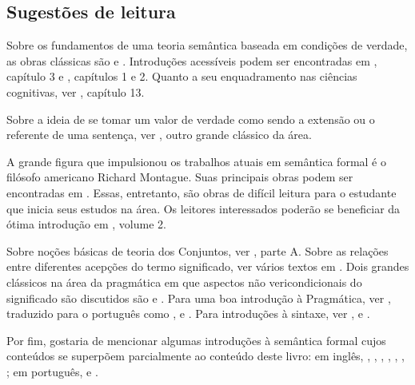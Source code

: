 \begin{tcolorbox}[parbox=false,boxrule=0pt,sharp corners,breakable]

\section*{Sugestões de leitura}



Sobre os fundamentos de uma teoria semântica baseada em
condições de verdade, as obras clássicas são \cite{tarski44} e
\cite{davidson67}. Introduções acessíveis podem ser encontradas
em \cite{taylor98}, capítulo 3 e \cite{larseg95}, capítulos 1
e 2. Quanto a seu enquadramento nas ciências cognitivas, ver
\cite{larseg95}, capítulo 13.

Sobre a ideia de se tomar um valor de verdade como sendo a
extensão ou o referente de uma sentença, ver \cite{frege92}, outro
grande clássico da área.

A grande figura que impulsionou os trabalhos atuais em semântica
formal é o filósofo americano Richard Montague. Suas principais
obras podem ser encontradas em \cite{thomason74}. Essas, entretanto, são obras
de difícil leitura para o estudante que inicia seus estudos na
área. Os leitores interessados poderão se beneficiar da ótima
introdução em \cite{gamut91}, volume 2.

Sobre noções básicas de teoria dos Conjuntos, ver \cite{partee90}, parte A. Sobre as relações entre
diferentes acepções do termo significado, ver vários textos em \cite{grice89}.
Dois grandes clássicos na área da pragmática em que aspectos não vericondicionais do significado são discutidos são \cite{grice75} e \cite{austin62}.
Para uma boa introdução à Pragmática, ver \cite{levinson83}, traduzido para o português como \cite{levinson07}, e \cite{pirbas14}. Para introduções à sintaxe, ver \cite{carnie13}, \cite{haegeman94} e \cite{mioal05}. 

Por fim, gostaria de mencionar algumas introduções à semântica
formal cujos conteúdos se superpõem parcialmente ao conteúdo deste
livro: em inglês, \cite{cann93}, \cite{larseg95}, \cite{chimcc00},
\cite{heikra98}, \cite{jacobson14}, \cite{deswart03}, \cite{winter16}; em português, \cite{chierchia03} e \cite{pires01}.

\end{tcolorbox}

\bigskip

